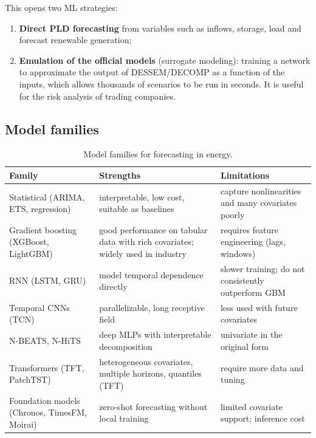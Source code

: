 \documentclass[10pt,a4paper,oneside]{article}
\begin{document}
This opens two ML strategies:
\begin{enumerate}
  \item \textbf{Direct PLD forecasting} from variables such as inflows,
    storage, load and forecast renewable generation;
  \item \textbf{Emulation of the official models} (surrogate modeling):
    training a network to approximate the output of DESSEM/DECOMP as a
    function of the inputs, which allows thousands of scenarios to be run in
    seconds. It is useful for the risk analysis of trading companies.
\end{enumerate}

\subsection{Model families}

\begin{table}[h]
\small
\caption{Model families for forecasting in energy.}
\begin{tabelalarga}
\begin{tabularx}{\linewidth}{l L L}
\toprule
\textbf{Family} & \textbf{Strengths} & \textbf{Limitations} \\
\midrule
Statistical (ARIMA, ETS, regression) & interpretable, low cost, suitable as
  baselines & capture nonlinearities and many covariates poorly \\
Gradient boosting (XGBoost, LightGBM) & good performance on tabular data
  with rich covariates; widely used in industry & requires feature
  engineering (lags, windows) \\
RNN (LSTM, GRU) & model temporal dependence directly & slower training; do
  not consistently outperform GBM \\
Temporal CNNs (TCN) & parallelizable, long receptive field & less used with
  future covariates \\
N-BEATS, N-HiTS & deep MLPs with interpretable decomposition & univariate in
  the original form \\
Transformers (TFT, PatchTST) & heterogeneous covariates, multiple horizons,
  quantiles (TFT)~\cite{tft} & require more data and tuning \\
Foundation models (Chronos, TimesFM, Moirai) & zero-shot forecasting without
  local training~\cite{chronos,timesfm} & limited covariate support;
  inference cost \\
\bottomrule
\end{tabularx}
\end{tabelalarga}
\end{table}
\end{document}
